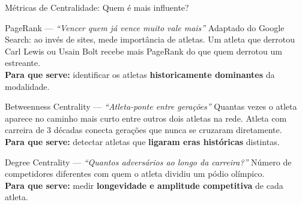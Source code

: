 \begin{frame}[shrink=2]{Métricas de Centralidade: Quem é mais influente?}

    \begin{block}{PageRank \cite{Brin1998PageRank} --- \textit{``Vencer quem já vence muito vale mais''}}
        \footnotesize
        Adaptado do Google Search: ao invés de sites, mede importância de atletas.
        Um atleta que derrotou Carl Lewis ou Usain Bolt recebe mais PageRank do que quem derrotou um estreante.\\
        \textbf{Para que serve:} identificar os atletas \textbf{historicamente dominantes} da modalidade.
    \end{block}

    \vspace{0.25cm}

    \begin{block}{Betweenness Centrality \cite{Freeman1979Centrality} --- \textit{``Atleta-ponte entre gerações''}}
        \footnotesize
        Quantas vezes o atleta aparece no caminho mais curto entre outros dois atletas na rede.
        Atleta com carreira de 3 décadas conecta gerações que nunca se cruzaram diretamente.\\
        \textbf{Para que serve:} detectar atletas que \textbf{ligaram eras históricas} distintas.
    \end{block}

    \vspace{0.25cm}

    \begin{block}{Degree Centrality \cite{Freeman1979Centrality} --- \textit{``Quantos adversários ao longo da carreira?''}}
        \footnotesize
        Número de competidores diferentes com quem o atleta dividiu um pódio olímpico.\\
        \textbf{Para que serve:} medir \textbf{longevidade e amplitude competitiva} de cada atleta.
    \end{block}

\end{frame}

